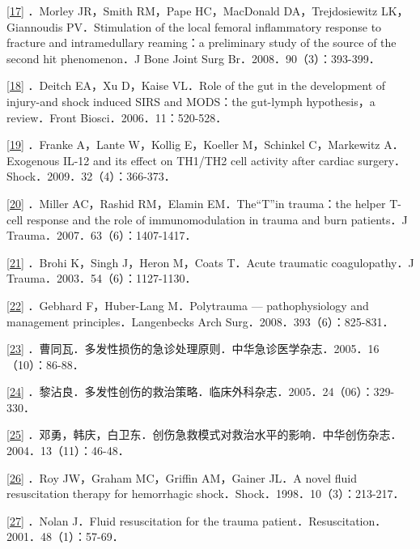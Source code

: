 \protect\hyperlink{text00024.htmlux5cux23ch17-23-back}{{[}17{]}}
．Morley JR，Smith RM，Pape HC，MacDonald DA，Trejdosiewitz
LK，Giannoudis PV．Stimulation of the local femoral inflammatory
response to fracture and intramedullary reaming：a preliminary study of
the source of the second hit phenomenon．J Bone Joint Surg
Br．2008．90（3）：393-399．

\protect\hyperlink{text00024.htmlux5cux23ch18-23-back}{{[}18{]}}
．Deitch EA，Xu D，Kaise VL．Role of the gut in the development of
injury-and shock induced SIRS and MODS：the gut-lymph hypothesis，a
review．Front Biosci．2006．11：520-528．

\protect\hyperlink{text00024.htmlux5cux23ch19-23-back}{{[}19{]}}
．Franke A，Lante W，Kollig E，Koeller M，Schinkel C，Markewitz
A．Exogenous IL-12 and its effect on TH1/TH2 cell activity after cardiac
surgery．Shock．2009．32（4）：366-373．

\protect\hyperlink{text00024.htmlux5cux23ch20-23-back}{{[}20{]}}
．Miller AC，Rashid RM，Elamin EM．The“T”in trauma：the helper T-cell
response and the role of immunomodulation in trauma and burn patients．J
Trauma．2007．63（6）：1407-1417．

\protect\hyperlink{text00024.htmlux5cux23ch21-23-back}{{[}21{]}} ．Brohi
K，Singh J，Heron M，Coats T．Acute traumatic coagulopathy．J
Trauma．2003．54（6）：1127-1130．

\protect\hyperlink{text00024.htmlux5cux23ch22-23-back}{{[}22{]}}
．Gebhard F，Huber-Lang M．Polytrauma --- pathophysiology and management
principles．Langenbecks Arch Surg．2008．393（6）：825-831．

\protect\hyperlink{text00024.htmlux5cux23ch23-23-back}{{[}23{]}}
．曹同瓦．多发性损伤的急诊处理原则．中华急诊医学杂志．2005．16（10）：86-88．

\protect\hyperlink{text00024.htmlux5cux23ch24-23-back}{{[}24{]}}
．黎沾良．多发性创伤的救治策略．临床外科杂志．2005．24（06）：329-330．

\protect\hyperlink{text00024.htmlux5cux23ch25-23-back}{{[}25{]}}
．邓勇，韩庆，白卫东．创伤急救模式对救治水平的影响．中华创伤杂志．2004．13（11）：46-48．

\protect\hyperlink{text00024.htmlux5cux23ch26-23-back}{{[}26{]}} ．Roy
JW，Graham MC，Griffin AM，Gainer JL．A novel fluid resuscitation
therapy for hemorrhagic shock．Shock．1998．10（3）：213-217．

\protect\hyperlink{text00024.htmlux5cux23ch27-23-back}{{[}27{]}} ．Nolan
J．Fluid resuscitation for the trauma
patient．Resuscitation．2001．48（1）：57-69．

